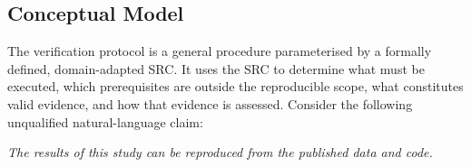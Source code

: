 \documentclass[conference,a4paper]{IEEEtran}
\begin{document}
  \subsection{Conceptual Model}

  The verification protocol is a general procedure parameterised by a formally defined, domain-adapted SRC. It uses the SRC to determine what must be executed, which prerequisites are outside the reproducible scope, what constitutes valid evidence, and how that evidence is assessed. Consider the following unqualified natural-language claim:

  \begin{statementbox}
    \textsl{The results of this study can be reproduced from the
    published data and code.}
  \end{statementbox}
\end{document}
